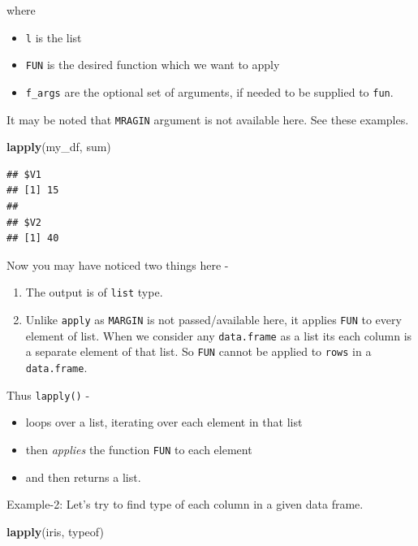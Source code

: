 \documentclass[
]{book}
\newenvironment{Shaded}{\begin{snugshade}}{\end{snugshade}}
\newcommand{\FunctionTok}[1]{\textcolor[rgb]{0.13,0.29,0.53}{\textbf{#1}}}
\newcommand{\NormalTok}[1]{#1}
\providecommand{\tightlist}{%
  \setlength{\itemsep}{0pt}\setlength{\parskip}{0pt}}
\begin{document}
where

\begin{itemize}
\tightlist
\item
  \texttt{l} is the list
\item
  \texttt{FUN} is the desired function which we want to apply
\item
  \texttt{f\_args} are the optional set of arguments, if needed to be supplied to \texttt{fun}.
\end{itemize}

It may be noted that \texttt{MRAGIN} argument is not available here. See these examples.

\begin{Shaded}
\begin{Highlighting}[]
\FunctionTok{lapply}\NormalTok{(my\_df, sum)}
\end{Highlighting}
\end{Shaded}

\begin{verbatim}
## $V1
## [1] 15
## 
## $V2
## [1] 40
\end{verbatim}

Now you may have noticed two things here -

\begin{enumerate}
\def\labelenumi{\arabic{enumi}.}
\tightlist
\item
  The output is of \texttt{list} type.
\item
  Unlike \texttt{apply} as \texttt{MARGIN} is not passed/available here, it applies \texttt{FUN} to every element of list. When we consider any \texttt{data.frame} as a list its each column is a separate element of that list. So \texttt{FUN} cannot be applied to \texttt{rows} in a \texttt{data.frame}.
\end{enumerate}

Thus \texttt{lapply()} -

\begin{itemize}
\tightlist
\item
  loops over a list, iterating over each element in that list
\item
  then \emph{applies} the function \texttt{FUN} to each element
\item
  and then returns a list.
\end{itemize}

Example-2: Let's try to find type of each column in a given data frame.

\begin{Shaded}
\begin{Highlighting}[]
\FunctionTok{lapply}\NormalTok{(iris, typeof)}
\end{Highlighting}
\end{Shaded}
\end{document}
